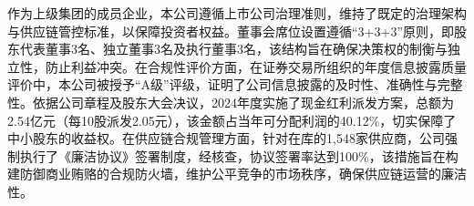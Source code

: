 \documentclass[a4paper,12pt]{article}
\begin{document}
作为上级集团的成员企业，本公司遵循上市公司治理准则，维持了既定的治理架构与供应链管控标准，以保障投资者权益。董事会席位设置遵循“3+3+3”原则，即股东代表董事3名、独立董事3名及执行董事3名，该结构旨在确保决策权的制衡与独立性，防止利益冲突。在合规性评价方面，在证券交易所组织的年度信息披露质量评价中，本公司被授予“A级”评级，证明了公司信息披露的及时性、准确性与完整性。依据公司章程及股东大会决议，2024年度实施了现金红利派发方案，总额为2.54亿元（每10股派发2.05元），该金额占当年可分配利润的40.12\%，切实保障了中小股东的收益权。在供应链合规管理方面，针对在库的1,548家供应商，公司强制执行了《廉洁协议》签署制度，经核查，协议签署率达到100\%，该措施旨在构建防御商业贿赂的合规防火墙，维护公平竞争的市场秩序，确保供应链运营的廉洁性。
\end{document}
